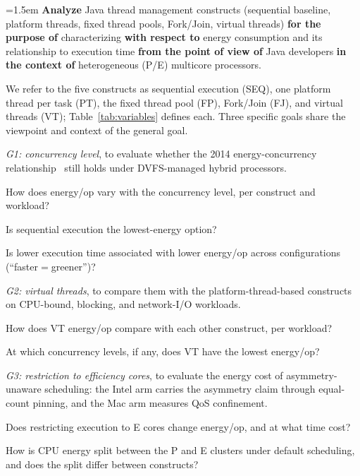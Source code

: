 \begin{list}{}{\setlength{\leftmargin}{1em}\setlength{\rightmargin}{0pt}\setlength{\topsep}{2pt}}\item[]
\emergencystretch=1.5em
\textbf{Analyze} Java thread management constructs (sequential baseline, platform threads, fixed thread pools, Fork/Join, virtual threads) \textbf{for the purpose of} characterizing \textbf{with respect to} energy consumption and its relationship to execution time \textbf{from the point of view of} Java developers \textbf{in the context of} heterogeneous (P/E) multicore processors.
\end{list}

\noindent We refer to the five constructs as sequential execution (SEQ), one platform thread per task (PT), the fixed thread pool (FP), Fork/Join (FJ), and virtual threads (VT); Table~\ref{tab:variables} defines each. Three specific goals share the viewpoint and context of the general goal.

\emph{G1: concurrency level}, to evaluate whether the 2014 energy-concurrency relationship~\cite{pinto2014energy} still holds under DVFS-managed hybrid processors.
\begin{planrq}
\item[RQ1.1] How does energy/op vary with the concurrency level, per construct and workload?
\item[RQ1.2] Is sequential execution the lowest-energy option?
\item[RQ1.3] Is lower execution time associated with lower energy/op across configurations (``faster${}={}$greener'')?
\end{planrq}

\emph{G2: virtual threads}, to compare them with the platform-thread-based constructs on CPU-bound, blocking, and network-I/O workloads.
\begin{planrq}
\item[RQ2.1] How does VT energy/op compare with each other construct, per workload?
\item[RQ2.2] At which concurrency levels, if any, does VT have the lowest energy/op?
\end{planrq}

\emph{G3: restriction to efficiency cores}, to evaluate the energy cost of asymmetry-unaware scheduling: the Intel arm carries the asymmetry claim through equal-count pinning, and the Mac arm measures QoS confinement.
\begin{planrq}
\item[RQ3.1] Does restricting execution to E cores change energy/op, and at what time cost?
\item[RQ3.2] How is CPU energy split between the P and E clusters under default scheduling, and does the split differ between constructs?
\end{planrq}

